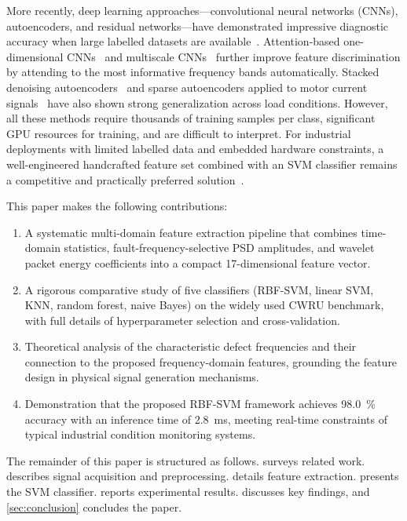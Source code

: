 \documentclass[conference,a4paper]{IEEEtran}[2015/08/26]
\begin{document}
More recently, deep learning approaches---convolutional neural
networks (CNNs), autoencoders, and residual networks---have demonstrated
impressive diagnostic accuracy when large labelled datasets are
available~\cite{Guo2016,Shao2017,Lei2020,Zhao2019}. Attention-based
one-dimensional CNNs~\cite{Wang2019} and multiscale
CNNs~\cite{Jiang2019} further improve feature discrimination by
attending to the most informative frequency bands automatically.
Stacked denoising autoencoders~\cite{Lu2017} and sparse autoencoders
applied to motor current signals~\cite{Sun2016} have also shown strong
generalization across load conditions. However, all these methods
require thousands of training samples per class, significant GPU
resources for training, and are difficult to interpret. For industrial
deployments with limited labelled data and embedded hardware constraints,
a well-engineered handcrafted feature set combined with an SVM
classifier remains a competitive and practically preferred
solution~\cite{Liu2018,Widodo2007}.

This paper makes the following contributions:
\begin{enumerate}
  \item A systematic multi-domain feature extraction pipeline that
    combines time-domain statistics, fault-frequency-selective PSD
    amplitudes, and wavelet packet energy coefficients into a
    compact 17-dimensional feature vector.
  \item A rigorous comparative study of five classifiers (RBF-SVM,
    linear SVM, KNN, random forest, naive Bayes) on the widely used
    CWRU benchmark, with full details of hyperparameter selection
    and cross-validation.
  \item Theoretical analysis of the characteristic defect frequencies
    and their connection to the proposed frequency-domain features,
    grounding the feature design in physical signal generation
    mechanisms.
  \item Demonstration that the proposed RBF-SVM framework achieves
    \SI{98.0}{\percent} accuracy with an inference time of
    \SI{2.8}{\milli\second}, meeting real-time constraints of
    typical industrial condition monitoring systems.
\end{enumerate}

The remainder of this paper is structured as follows.
 surveys related work.
 describes signal acquisition and preprocessing.
 details feature extraction.
 presents the SVM classifier.
 reports experimental results.
 discusses key findings, and
\cref{sec:conclusion} concludes the paper.
\end{document}
